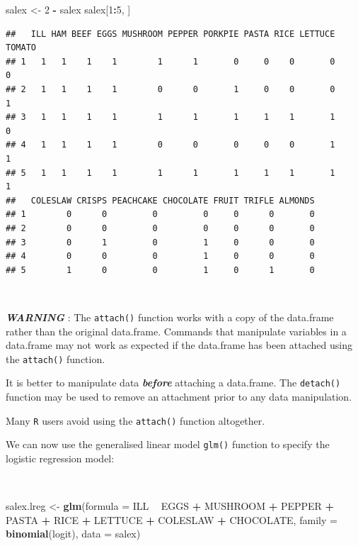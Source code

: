 \documentclass[12pt,a4paper]{book}
\newenvironment{Shaded}{\begin{snugshade}}{\end{snugshade}}
\newcommand{\DataTypeTok}[1]{\textcolor[rgb]{0.13,0.29,0.53}{#1}}
\newcommand{\DecValTok}[1]{\textcolor[rgb]{0.00,0.00,0.81}{#1}}
\newcommand{\KeywordTok}[1]{\textcolor[rgb]{0.13,0.29,0.53}{\textbf{#1}}}
\newcommand{\NormalTok}[1]{#1}
\newcommand{\OperatorTok}[1]{\textcolor[rgb]{0.81,0.36,0.00}{\textbf{#1}}}
\newcommand{\StringTok}[1]{\textcolor[rgb]{0.31,0.60,0.02}{#1}}
\theoremstyle{definition}
\theoremstyle{definition}
\theoremstyle{definition}
\theoremstyle{remark}
\begin{document}
\begin{Shaded}
\begin{Highlighting}[]
\NormalTok{salex <-}\StringTok{ }\DecValTok{2} \OperatorTok{-}\StringTok{ }\NormalTok{salex}
\NormalTok{salex[}\DecValTok{1}\OperatorTok{:}\DecValTok{5}\NormalTok{, ]}
\end{Highlighting}
\end{Shaded}

\begin{verbatim}
##   ILL HAM BEEF EGGS MUSHROOM PEPPER PORKPIE PASTA RICE LETTUCE TOMATO
## 1   1   1    1    1        1      1       0     0    0       0      0
## 2   1   1    1    1        0      0       1     0    0       0      1
## 3   1   1    1    1        1      1       1     1    1       1      0
## 4   1   1    1    1        0      0       0     0    0       1      1
## 5   1   1    1    1        1      1       1     1    1       1      1
##   COLESLAW CRISPS PEACHCAKE CHOCOLATE FRUIT TRIFLE ALMONDS
## 1        0      0         0         0     0      0       0
## 2        0      0         0         0     0      0       0
## 3        0      1         0         1     0      0       0
## 4        0      0         0         1     0      0       0
## 5        1      0         0         1     0      1       0
\end{verbatim}

~

\textbf{\emph{WARNING}} : The \texttt{attach()} function works with a
copy of the data.frame rather than the original data.frame. Commands
that manipulate variables in a data.frame may not work as expected if
the data.frame has been attached using the \texttt{attach()} function.

It is better to manipulate data \textbf{\emph{before}} attaching a
data.frame. The \texttt{detach()} function may be used to remove an
attachment prior to any data manipulation.

Many \texttt{R} users avoid using the \texttt{attach()} function
altogether.

We can now use the generalised linear model \texttt{glm()} function to
specify the logistic regression model:

~

\begin{Shaded}
\begin{Highlighting}[]
\NormalTok{salex.lreg <-}\StringTok{ }\KeywordTok{glm}\NormalTok{(}\DataTypeTok{formula =}\NormalTok{ ILL }\OperatorTok{~}\StringTok{ }\NormalTok{EGGS }\OperatorTok{+}\StringTok{ }\NormalTok{MUSHROOM }\OperatorTok{+}\StringTok{ }\NormalTok{PEPPER }\OperatorTok{+}\StringTok{ }\NormalTok{PASTA }\OperatorTok{+}
\StringTok{                  }\NormalTok{RICE }\OperatorTok{+}\StringTok{ }\NormalTok{LETTUCE }\OperatorTok{+}\StringTok{ }\NormalTok{COLESLAW }\OperatorTok{+}\StringTok{ }\NormalTok{CHOCOLATE,}
                  \DataTypeTok{family =} \KeywordTok{binomial}\NormalTok{(logit), }\DataTypeTok{data =}\NormalTok{ salex)}
\end{Highlighting}
\end{Shaded}
\end{document}

